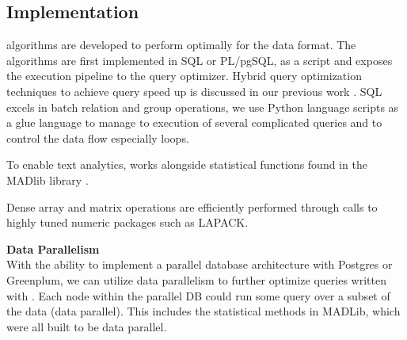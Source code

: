 \subsection{{\system} Implementation}


\system algorithms are developed to perform optimally for the data format.
The algorithms are first implemented in SQL or PL/pgSQL, as a script and 
exposes the execution pipeline to the query optimizer. 
Hybrid query optimization techniques to achieve query speed up is discussed in
our previous work \cite{wang2011hybrid}.
SQL excels in batch relation and group operations, we use Python language
scripts as a glue language to manage to execution of several complicated 
queries and to control the data flow especially loops.


To enable text analytics, {\system} works alongside statistical
functions found in the MADlib library \cite{Cohen:2009:MSN:1687553.1687576}.

Dense array and matrix operations are efficiently performed 
through calls to highly tuned numeric packages such as LAPACK.


\noindent
\textbf{Data Parallelism}\\
With the ability to implement a parallel database architecture with Postgres or 
Greenplum, we can utilize data parallelism to further optimize queries written
with {\system}. Each node within the parallel DB could run some query
over a subset of the data (data parallel). This includes the statistical methods
in MADLib, which were all built to be data parallel.

